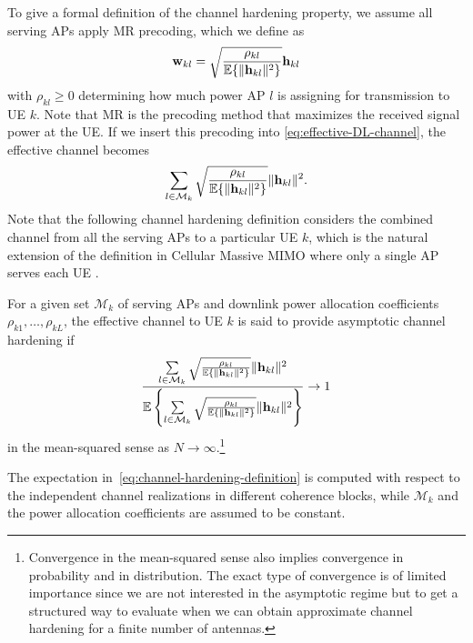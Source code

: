 To give a formal definition of the channel hardening property, we assume all serving APs apply  \gls{MR} precoding, which we define as
\begin{equation} \label{eq:MR-precoding-hardening}
\mathbf{w}_{kl} = \sqrt{\frac{\rho_{kl}}{\mathbb{E} \{\| \mathbf{h}_{kl} \|^2 \}} } \mathbf{h}_{kl}
\end{equation}
with $\rho_{kl}\geq 0$ determining how much power AP $l$ is assigning for transmission to UE $k$. Note that MR is the precoding method that maximizes the received signal power at the UE. If we insert this precoding into \eqref{eq:effective-DL-channel}, the effective channel becomes
\begin{equation} \label{eq:effective-DL-channel2}
\sum_{l \in \mathcal{M}_k} \sqrt{\frac{\rho_{kl}}{\mathbb{E} \{\| \mathbf{h}_{kl} \|^2 \}} } \| \mathbf{h}_{kl} \|^2.
\end{equation}
Note that the following channel hardening definition considers the combined channel from all the serving APs to a particular UE $k$, which is the natural extension of the definition in Cellular Massive \gls{MIMO} where only a single AP serves each UE \cite[Sec.~2.5.1]{massivemimobook}.

\begin{definition} \label{def:channel-hardening-new}
For a given set $\mathcal{M}_k$ of serving APs and downlink power allocation coefficients $\rho_{k1},\ldots,\rho_{kL}$, the effective channel to \gls{UE} $k$ is said to provide
asymptotic channel hardening if
\begin{equation} \label{eq:channel-hardening-definition}
\frac{ \sum\limits_{l \in \mathcal{M}_k} \sqrt{\frac{\rho_{kl}}{\mathbb{E} \{\| \mathbf{h}_{kl} \|^2 \}} } \| \mathbf{h}_{kl} \|^2 }{ \mathbb{E} \left\{ \sum\limits_{l \in \mathcal{M}_k} \sqrt{\frac{\rho_{kl}}{\mathbb{E} \{\| \mathbf{h}_{kl} \|^2 \}} } \| \mathbf{h}_{kl} \|^2  \right\} } \rightarrow 1
\end{equation}
in the mean-squared sense as $N \to \infty$.\footnote{Convergence in the mean-squared sense also implies convergence in probability and in distribution. The exact type of convergence is of limited importance since we are not interested in the asymptotic regime but to get a structured way to evaluate when we can obtain approximate channel hardening for a finite number of antennas.}
\end{definition}



The expectation in~\eqref{eq:channel-hardening-definition} is computed with respect to the independent channel realizations in different coherence blocks, while $\mathcal{M}_k$ and the power allocation coefficients are assumed to be constant.

